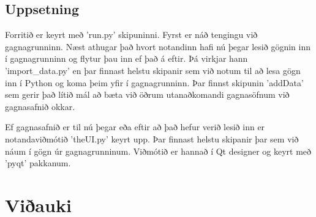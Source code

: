 \documentclass[11pt,a4paper]{amsart}
\theoremstyle{plain}
\theoremstyle{definition}
\theoremstyle{remark}
\begin{document}
\subsection{Uppsetning}
Forritið er keyrt með 'run.py' skipuninni. Fyrst er náð tengingu við gagnagrunninn. Næst athugar það hvort notandinn hafi nú þegar lesið gögnin inn í gagnagrunninn og flytur þau inn ef það á eftir. Þá virkjar hann 'import\_data.py' en þar finnast helstu skipanir sem við notum til að lesa gögn inn í Python og koma þeim yfir í gagnagrunninn. Þar finnst skipunin 'addData' sem gerir það lítið mál að bæta við öðrum utanaðkomandi gagnasöfnum við gagnasafnið okkar.\\\par
Ef gagnasafnið er til nú þegar eða eftir að það hefur verið lesið inn er notandaviðmótið 'theUI.py' keyrt upp. Þar finnast helstu skipanir þar sem við náum í gögn úr gagnagrunninum. Viðmótið er hannað í Qt designer og keyrt með 'pyqt' pakkanum.

\newpage

\section{Viðauki}
\end{document}
